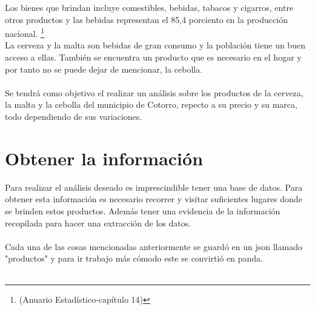 \documentclass{article}
\begin{document}
    Los bienes que brindan incluye comestibles, bebidas, tabacos y cigarros, entre otros productos y las bebidas representan el 85,4 porciento en la producción nacional.
    \footnote{(Anuario Estadístico-capítulo 14)}
    \\
    La cerveza y la malta son bebidas de gran consumo y la población tiene un buen acceso a ellas. También se encuentra un producto que es necesario en el hogar y por tanto no se puede dejar de mencionar, la cebolla.\\
    \\
    Se tendrá como objetivo el realizar un análisis sobre los productos de la cerveza, la malta y la cebolla del municipio de Cotorro, repecto a su precio y su marca, todo dependiendo de sus variaciones.
    \newpage
    \part*{Obtener la información}
    Para realizar el análisis deseado es imprescindible tener una base de datos. Para obtener esta información es necesario recorrer y visitar suficientes lugares donde se brinden estos productos.
    Además tener una evidencia de la información recopilada para hacer una extracción de los datos.\\
    \\
    Cada una de las cosas mencionadas anteriormente se guardó en un json llamado "productos" y para ir trabajo más cómodo este se convirtió en panda.\\
    \\
\end{document}
